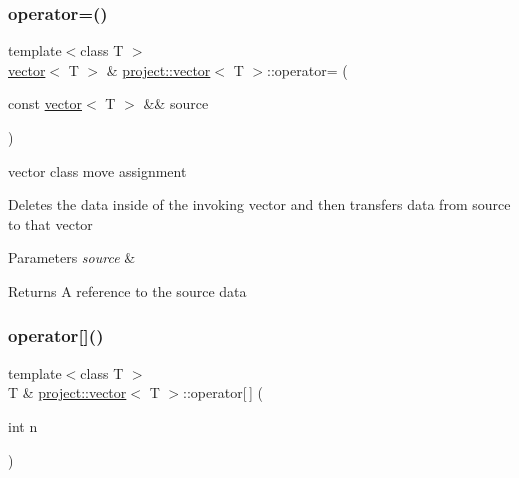 \subsubsection{\texorpdfstring{operator=()}{operator=()}\hspace{0.1cm}{\footnotesize\ttfamily [2/2]}}
{\footnotesize\ttfamily template$<$class T $>$ \\
\mbox{\hyperlink{classproject_1_1vector}{vector}}$<$ T $>$ \& \mbox{\hyperlink{classproject_1_1vector}{project\+::vector}}$<$ T $>$\+::operator= (\begin{DoxyParamCaption}\item[{const \mbox{\hyperlink{classproject_1_1vector}{vector}}$<$ T $>$ \&\&}]{source }\end{DoxyParamCaption})\hspace{0.3cm}{\ttfamily [inline]}}



vector class move assignment 

Deletes the data inside of the invoking vector and then transfers data from source to that vector 
\begin{DoxyParams}{Parameters}
{\em source} & \\
\hline
\end{DoxyParams}
\begin{DoxyReturn}{Returns}
A reference to the source data 
\end{DoxyReturn}
\mbox{\label{classproject_1_1vector_a24d62308b10b6cd2712964d0ac9597dd}} 
\subsubsection{\texorpdfstring{operator[]()}{operator[]()}\hspace{0.1cm}{\footnotesize\ttfamily [1/2]}}
{\footnotesize\ttfamily template$<$class T $>$ \\
T \& \mbox{\hyperlink{classproject_1_1vector}{project\+::vector}}$<$ T $>$\+::operator\mbox{[}$\,$\mbox{]} (\begin{DoxyParamCaption}\item[{int}]{n }\end{DoxyParamCaption})\hspace{0.3cm}{\ttfamily [inline]}}




